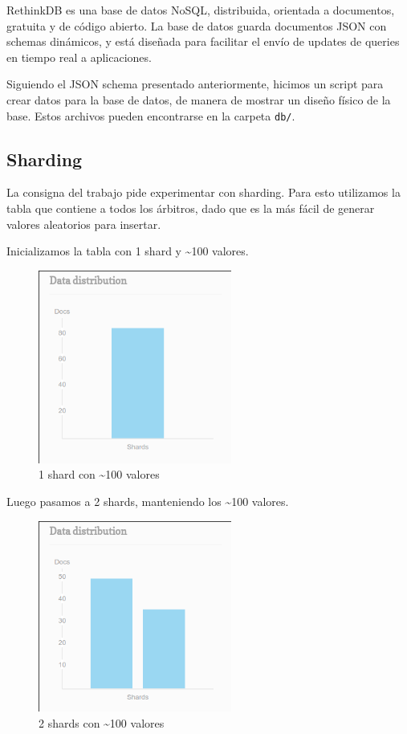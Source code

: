 
RethinkDB es una base de datos NoSQL, distribuida, orientada a documentos, gratuita y de código abierto. La base de datos guarda documentos JSON con schemas dinámicos, y está diseñada para facilitar el envío de updates de queries en tiempo real a aplicaciones.

Siguiendo el JSON schema presentado anteriormente, hicimos un script para crear datos para la base de datos, de manera de mostrar un diseño físico de la base. Estos archivos pueden encontrarse en la carpeta \texttt{db/}.


\subsection{Sharding}

La consigna del trabajo pide experimentar con sharding. Para esto utilizamos la tabla que contiene a todos los árbitros, dado que es la más fácil de generar valores aleatorios para insertar.

Inicializamos la tabla con 1 shard y \textasciitilde 100 valores.

\begin{figure}[H]
 \centering
 \includegraphics[width=2.5in]{sharding/img/1shard.png}
 \caption{1 shard con \textasciitilde 100 valores}
 \label{fig:1shard}
\end{figure}

Luego pasamos a 2 shards, manteniendo los \textasciitilde 100 valores.

\begin{figure}[H]
 \centering
 \includegraphics[width=2.5in]{sharding/img/2shard.png}
 \caption{2 shards con \textasciitilde 100 valores}
 \label{fig:2shard}
\end{figure}

